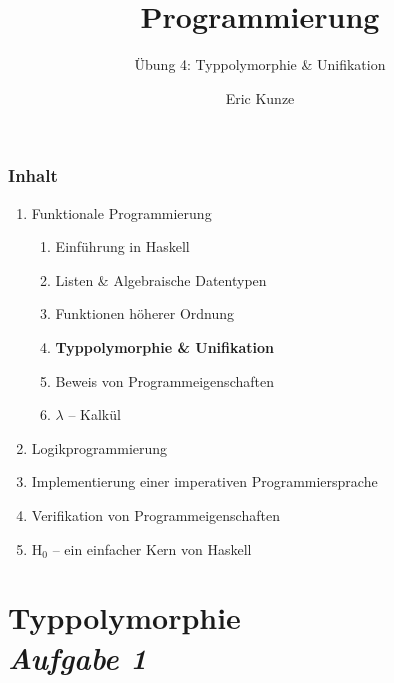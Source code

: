 \documentclass{beamer}
\begin{document}
	
	\title{Programmierung}
	\subtitle{Übung 4: Typpolymorphie \& Unifikation}
	\author{Eric Kunze}
	\date{}
	
	\maketitle
	


\begin{frame}[fragile] \frametitle{Inhalt}
	\begin{enumerate}
		\item Funktionale Programmierung
		\begin{enumerate}
			\item Einführung in Haskell
			\item Listen \& Algebraische Datentypen
			\item Funktionen höherer Ordnung
			\item \textbf{Typpolymorphie \& Unifikation}
			\item Beweis von Programmeigenschaften
			\item $\lambda$ -- Kalkül
		\end{enumerate}
		\item Logikprogrammierung
		\item Implementierung einer imperativen Programmiersprache
		\item Verifikation von Programmeigenschaften
		\item H${}_\text{0}$ -- ein einfacher Kern von Haskell
	\end{enumerate}
\end{frame}



\section{Typpolymorphie \\ \textit{\normalsize Aufgabe 1}}
\end{document}
